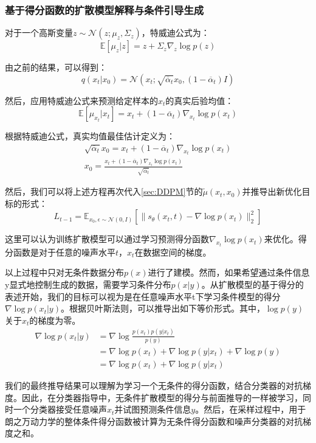 \subsubsection{基于得分函数的扩散模型解释与条件引导生成}
对于一个高斯变量$z\sim \mathcal{N} ( z ; \mu_z , \Sigma_z)$，特威迪公式为：
\begin{equation}\label{eqn-27}
\mathbb{E}[\mu_z | z] = z + \Sigma_z\nabla_z\log{p(z)}
\end{equation}
\par
由之前的结果，可以得到：
\begin{equation}\label{eqn-28}
      q(x_t|x_0) = \mathcal{N}(x_t;\sqrt{\overline{\alpha}_t}x_0,(1-\overline{\alpha}_t)I)
\end{equation}
\par
然后，应用特威迪公式来预测给定样本的$x_t$的真实后验均值：
\begin{equation}\label{eqn-29}
  \mathbb{E}[\mu_{x_t} | x_t] = x_t + (1-\overline{\alpha}_t)\nabla_{x_t}\log{p(x_t)}
\end{equation}
\par
根据特威迪公式，真实均值最佳估计定义为：
\begin{align}
  \sqrt{\overline{\alpha}_t}x_0 = x_t + (1-\overline{\alpha}_t)\nabla_{x_t}\log{p(x_t)} \label{eqn-30} \\
  x_0 =\frac{ x_t + (1-\overline{\alpha}_t)\nabla_{x_t}\log{p(x_t)}}{\sqrt{\overline{\alpha}_t}} \label{eqn-31}
\end{align}
\par
然后，我们可以将上述方程再次代入\ref{sec:DDPM}节的$\widetilde{\mu}(x_t,x_0)$并推导出新优化目标的形式：
\begin{equation}\label{eqn-32}
      L_{t-1}=\mathbb{E}_{x_0,\epsilon \sim \mathcal{N}(0,I)}[\lVert s_\theta(x_t,t) - \nabla \log p(x_t)\rVert^2_2]
\end{equation}
\par
这里可以认为训练扩散模型可以通过学习预测得分函数$\nabla_{x_t}\log{p(x_t)}$来优化。得分函数是对于任意的噪声水平$t$，$x_t$在数据空间的梯度。
\par
以上过程中只对无条件数据分布$p ( x )$进行了建模。然而，如果希望通过条件信息y显式地控制生成的数据，需要学习条件分布$p ( x | y )$。从扩散模型的基于得分的表述开始，我们的目标可以视为是在任意噪声水平t下学习条件模型的得分$\nabla \log p ( x_t | y )$。根据贝叶斯法则，可以推导出如下等价形式。其中，$\log p ( y )$关于$x_t$的梯度为零。
\begin{align}
  \nabla \log p (x_t|y)
  &= \nabla \log \frac{
    p(x_t)p(y|x_t)
  }{
    p(y)
  } \nonumber\\
  &= \nabla \log p(x_t) + \nabla \log p(y|x_t) + \nabla \log p(y) \nonumber\\
  &= \nabla \log p(x_t) + \nabla \log p(y|x_t) \label{eqn-33}
\end{align}
\par
我们的最终推导结果可以理解为学习一个无条件的得分函数，结合分类器的对抗梯度。因此，在分类器指导中，无条件扩散模型的得分与前面推导的一样被学习，同时一个分类器接受任意噪声$x_t$并试图预测条件信息$y$。然后，在采样过程中，用于朗之万动力学的整体条件得分函数被计算为无条件得分函数和噪声分类器的对抗梯度之和。

